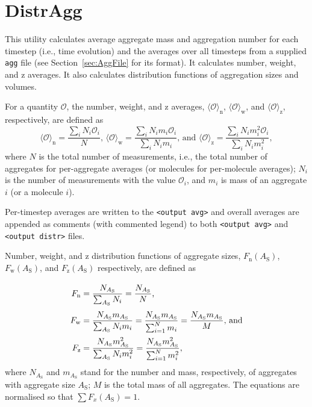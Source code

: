 \section{DistrAgg} \label{sec:DistrAgg}

This utility calculates average aggregate mass and aggregation number for
each timestep (i.e., time evolution) and the averages over all timesteps
from a supplied \texttt{agg} file (see Section~\ref{sec:AggFile} for its format).
It calculates number, weight, and z averages. It also calculates
distribution functions of aggregation sizes and volumes.

For a quantity $\mathcal{O}$, the number, weight, and z averages,
$\langle\mathcal{O}\rangle_{\text{n}}$,
$\langle\mathcal{O}\rangle_{\text{w}}$, and
$\langle\mathcal{O}\rangle_{\text{z}}$, respectively, are defined as
\begin{equation} \label{eq:Avg}
  \langle\mathcal{O}\rangle_{\text{n}} = \frac{\sum_i N_i\mathcal{O}_i     }{N}
  \mbox{, \ \ \ }
  \langle\mathcal{O}\rangle_{\text{w}} = \frac{\sum_i N_im_i\mathcal{O}_i  }{\sum_i N_i m_i}
  \mbox{, and \ \ \ }
  \langle\mathcal{O}\rangle_{\text{z}} = \frac{\sum_i N_im_i^2\mathcal{O}_i}{\sum_i N_i m_i^2},
\end{equation}
where $N$ is the total number of measurements, i.e., the total number of
aggregates for per-aggregate averages (or molecules for per-molecule
averages); $N_i$ is the number of measurements with the value
$\mathcal{O}_i$, and $m_i$ is mass of an aggregate $i$ (or a molecule $i$).

Per-timestep averages are written to the \texttt{<output avg>} and overall
averages are appended as comments (with commented legend) to both
\texttt{<output avg>} and \texttt{<output distr>} files.

Number, weight, and z distribution functions of aggregate sizes,
$F_{\text{n}}(A_{\text{S}})$, $F_{\text{w}}(A_{\text{S}})$, and
$F_{\text{z}}(A_{\text{S}})$ respectively, are defined as
\begin{equation} \label{eq:Fnwz}
  \arraycolsep=1.4pt\def\arraystretch{2.5}
  \begin{array}{>{\displaystyle}rc>{\displaystyle}l}
    F_{\text{n}} & = & \frac{N_{A_{\text{S}} }}{\sum_{A_{\text{S}} } N_i} =
    \frac{N_{A_{\text{S}} }}{N}
  \mbox{,} \\
    F_{\text{w}} & = & \frac{N_{A_{\text{S}} } m_{A_{\text{S}} }}{\sum_{A_{\text{S}} } N_i m_i} =
    \frac{N_{A_{\text{S}} } m_{A_{\text{S}} }}{\sum_{i=1}^N m_i} =
    \frac{N_{A_{\text{S}} } m_{A_{\text{S}} }}{M}
  \mbox{, and} \\
    F_{\text{z}} & = & \frac{N_{A_{\text{S}} } m^2_{A_{\text{S}}
    }}{\sum_{A_{\text{S}} } N_i m_i^2} =
    \frac{N_{A_{\text{S}} } m^2_{A_{\text{S}} }}{\sum_{i=1}^N m_i^2}, \\
  \end{array}
\end{equation}
where $N_{A_{\text{S}}}$ and $m_{A_{\text{S}}}$ stand for the number
and mass, respectively, of aggregates with aggregate size $A_{\text{S}}$;
$M$ is the total mass of all aggregates. The equations are normalised so
that $\sum F_x(A_{\text{S}})=1$.

